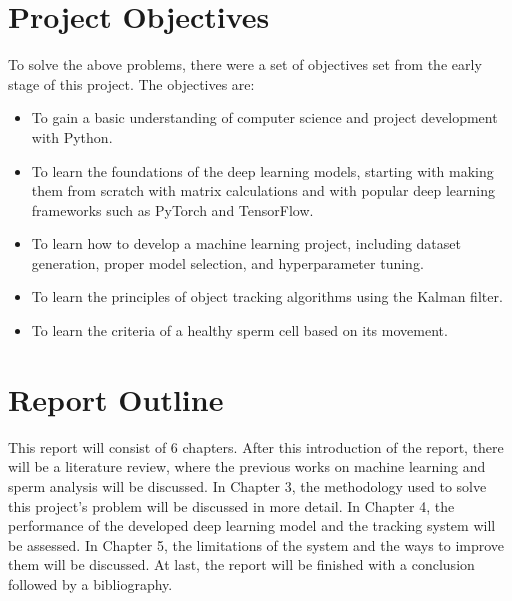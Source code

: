 \section{Project Objectives}
To solve the above problems, there were a set of objectives set from the early stage of this project. The objectives are:
\begin{itemize}
    \item To gain a basic understanding of computer science and project development with Python.
    \item To learn the foundations of the deep learning models, starting with making them from scratch with matrix calculations and with popular deep learning frameworks such as PyTorch and TensorFlow.
    \item To learn how to develop a machine learning project, including dataset generation, proper model selection, and hyperparameter tuning.
    \item To learn the principles of object tracking algorithms using the Kalman filter.
    \item To learn the criteria of a healthy sperm cell based on its movement.
\end{itemize}
\section{Report Outline}
This report will consist of 6 chapters. After this introduction of the report, there will be a literature review, where the previous works on machine learning and sperm analysis will be discussed. In Chapter 3, the methodology used to solve this project's problem will be discussed in more detail. In Chapter 4, the performance of the developed deep learning model and the tracking system will be assessed. In Chapter 5, the limitations of the system and the ways to improve them will be discussed. At last, the report will be finished with a conclusion followed by a bibliography.